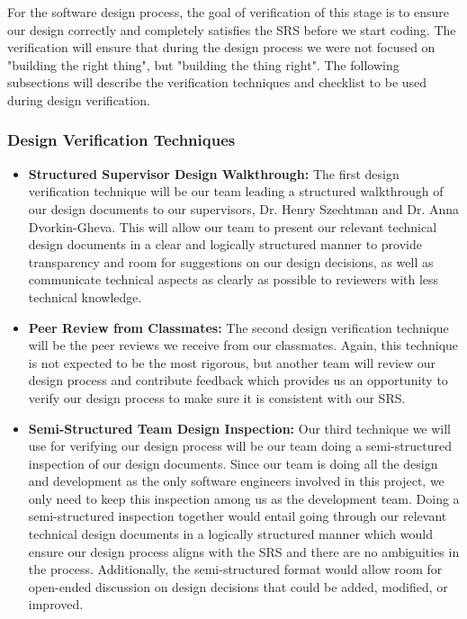 \documentclass[12pt, titlepage]{article}
\begin{document}
\par{For the software design process, the goal of verification of this stage is to ensure our design correctly and completely satisfies 
the SRS before we start coding. The verification will ensure that during the design process we were not focused on 
"building the right thing", but "building the thing right". The following subsections will describe the verification techniques and 
checklist to be used during design verification.}

\subsubsection{Design Verification Techniques}

\begin{itemize}
  \item{\textbf{Structured Supervisor Design Walkthrough:} The first design verification technique will be our team leading a structured 
  walkthrough of our design documents to our supervisors, Dr. Henry Szechtman and Dr. Anna Dvorkin-Gheva. This will allow our team to present 
  our relevant technical design documents in a clear and logically structured manner to provide transparency and room for suggestions 
  on our design decisions, as well as communicate technical aspects as clearly as possible to reviewers with less technical knowledge.
  }
  \item{\textbf{Peer Review from Classmates:} The second design verification technique will be the peer reviews we receive from our classmates. 
  Again, this technique is not expected to be the most rigorous, but another team will review our design process and contribute feedback 
  which provides us an opportunity to verify our design process to make sure it is consistent with our SRS.
  }
  \item{\textbf{Semi-Structured Team Design Inspection:} Our third technique we will use for verifying our design process will be 
  our team doing a semi-structured inspection of our design documents. Since our team is doing all the design and development 
  as the only software engineers involved in this project, we only need to keep this inspection among us as the development team. 
  Doing a semi-structured inspection together would entail going through our relevant technical design documents in a logically 
  structured manner which would ensure our design process aligns with the SRS and there are no ambiguities in the process. Additionally, 
  the semi-structured format would allow room for open-ended discussion on design decisions that could be added, modified, or improved.
}
\end{itemize}
\end{document}
